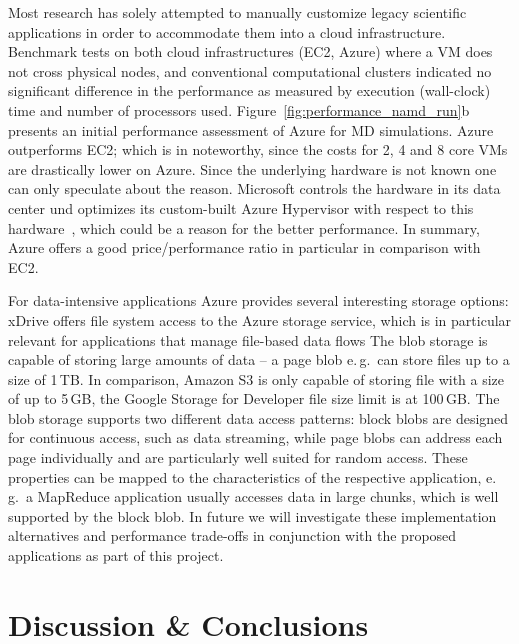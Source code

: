 \documentclass[graybox]{svmult}
\begin{document}
Most research has solely attempted to manually customize legacy
scientific applications in order to accommodate them into a cloud
infrastructure. Benchmark tests on both cloud infrastructures (EC2,
Azure) where a VM does not cross physical nodes, and conventional
computational clusters indicated no significant difference in the
performance as measured by execution (wall-clock) time and number of
processors used. Figure~\ref{fig:performance_namd_run}b presents an
initial performance assessment of Azure for MD simulations. Azure
outperforms
EC2; %
which is in noteworthy, since the costs for 2, 4 and 8 core VMs are
drastically lower on Azure. Since the underlying hardware is not known
one can only speculate about the reason. Microsoft controls the
hardware in its data center und optimizes its custom-built Azure
Hypervisor with respect to this hardware~\cite{Krishnan:2010nx}, which
could be a reason for the better performance. In summary, Azure offers
a good price/performance ratio in particular in comparison with EC2.


For data-intensive applications Azure provides several interesting
storage options: xDrive offers file system access to the Azure storage
service, which is in particular relevant for applications that manage
file-based data flows %
The blob storage is capable of storing large amounts of data -- a page
blob e.\,g.\ can store files up to a size of 1\,TB.  In comparison,
Amazon S3 is only capable of storing file with a size of up to 5\,GB,
the Google Storage for Developer file size limit is at 100\,GB. The
blob storage supports two different data access patterns: block blobs
are designed for continuous access, such as data streaming, while page
blobs can address each page individually and are particularly well
suited for random access. These properties can be mapped to the
characteristics of the respective application, e.\,g.\ a MapReduce
application usually accesses data in large chunks, which is well
supported by the block blob. In future we will investigate these
implementation alternatives and performance trade-offs in conjunction
with the proposed applications as part of this project.


\section{Discussion \& Conclusions}
\label{sec:discuss}
\end{document}

